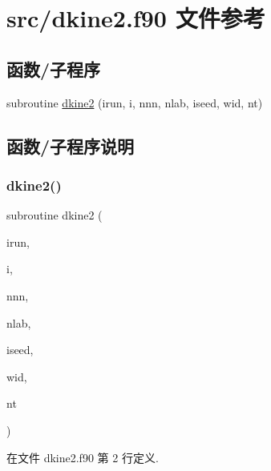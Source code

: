 \hypertarget{dkine2_8f90}{}\section{src/dkine2.f90 文件参考}
\label{dkine2_8f90}
\subsection*{函数/子程序}
\begin{DoxyCompactItemize}
\item 
subroutine \mbox{\hyperlink{dkine2_8f90_a32addcfaa82263d323656702c1ef4629}{dkine2}} (irun, i, nnn, nlab, iseed, wid, nt)
\end{DoxyCompactItemize}


\subsection{函数/子程序说明}
\mbox{\label{dkine2_8f90_a32addcfaa82263d323656702c1ef4629}} 
\subsubsection{\texorpdfstring{dkine2()}{dkine2()}}
{\footnotesize\ttfamily subroutine dkine2 (\begin{DoxyParamCaption}\item[{}]{irun,  }\item[{}]{i,  }\item[{}]{nnn,  }\item[{}]{nlab,  }\item[{}]{iseed,  }\item[{}]{wid,  }\item[{}]{nt }\end{DoxyParamCaption})}



在文件 dkine2.\+f90 第 2 行定义.

